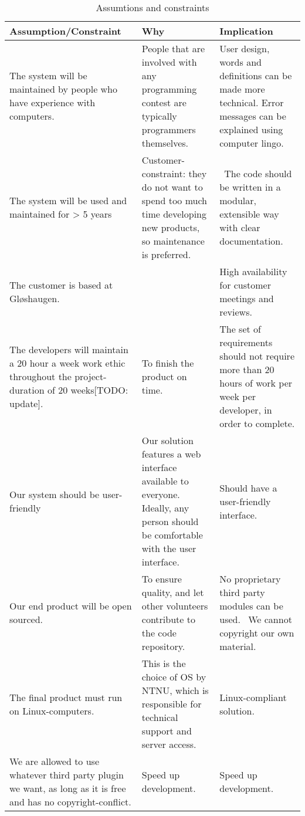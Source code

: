 \begin{table}
\caption{Assumtions and constraints}
\label{table:assumtions}
\tablehead{}
\begin{supertabular}{|p{0.33\textwidth}|p{0.33\textwidth}|p{0.33\textwidth}|}
\hline
Assumption/Constraint &
Why &
Implication\\\hline
The system will be maintained by people who have experience with
computers. &
People that are involved with any programming contest are typically
programmers themselves. &
User design, words and definitions can be made more technical. Error
messages can be explained using computer lingo. \\\hline

The system will be used and maintained for {\textgreater} 5 years &
Customer{}-constraint: they do not want to spend too much time
developing new products, so maintenance is preferred. &
\ The code should be written in a modular, extensible way with clear
documentation.\\\hline

The customer is based at Gl{\o}shaugen. &
~
 &
High availability for customer meetings and reviews.\\\hline

The developers will maintain a 20 hour a week work ethic throughout the
project{}-duration of 20 weeks[TODO: update]. &
To finish the product on time. &
The set of requirements should not require more than 20 hours of work
per week per developer, in order to complete.\\\hline
Our system should be user{}-friendly &
Our solution features a web interface available to everyone. Ideally,
any person should be comfortable with the user interface. &
Should have a user{}-friendly interface.
\\\hline
Our end product will be open sourced. &
To ensure quality, and let other volunteers contribute to the code
repository. &
No proprietary third party modules can be used. \ We cannot copyright
our own material. \\\hline
The final product must run on Linux{}-computers. &
This is the choice of OS by NTNU, which is responsible for technical
support and server access. &
Linux{}-compliant solution.\\\hline
We are allowed to use whatever third party plugin we want, as long as it
is free and has no copyright{}-conflict. &
Speed up development. &
Speed up development.\\\hline
\end{supertabular}
\end{table}

